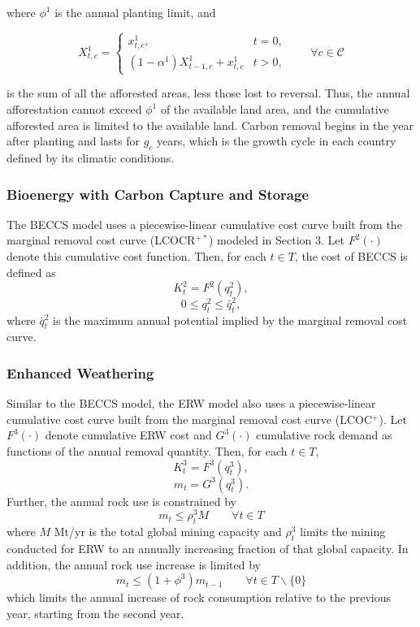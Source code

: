 where $\phi^1$ is the annual planting limit, and 

\begin{equation}
X_{t,c}^1 =
    \begin{cases}
      x_{t,c}^1, & t = 0,\\
      (1-\alpha^1)X_{t-1,c}^1+x_{t,c}^1 & t > 0,
    \end{cases}
    \qquad \forall c \in \mathcal{C}
\end{equation}

is the sum of all the afforested areas, less those lost to reversal. Thus, the annual afforestation cannot exceed $\phi^1$ of the available land area, and the cumulative afforested area is limited to the available land. Carbon removal begins in the year after planting and lasts for $g_c$ years, which is the growth cycle in each country defined by its climatic conditions.

\subsubsection{Bioenergy with Carbon Capture and Storage}
The BECCS model uses a piecewise-linear cumulative cost curve built from the marginal removal cost curve (LCOCR$^{+*}$) modeled in Section 3. Let $F^2(\cdot)$ denote this cumulative cost function. Then, for each $t \in T$, the cost of BECCS is defined as
\begin{equation} 
K^2_t = F^2(q_t^2),
\end{equation}
\begin{equation} 
0 \leq q_t^2 \leq \bar{q}_t^2,
\end{equation}
where $\bar{q}_t^2$ is the maximum annual potential implied by the marginal removal cost curve.

\subsubsection{Enhanced Weathering}
Similar to the BECCS model, the ERW model also uses a piecewise-linear cumulative cost curve built from the marginal removal cost curve (LCOC$^+$). Let $F^3(\cdot)$ denote  cumulative ERW cost and $G^3(\cdot)$ cumulative rock demand as functions of the annual removal quantity. Then, for each $t \in T$,
\begin{equation} 
K^3_t = F^3(q_t^3),
\end{equation}
\begin{equation} 
m_t = G^3(q_t^3).
\end{equation}
Further, the annual rock use is constrained by
\begin{equation} 
m_t \leq \rho_t^3M \qquad \forall t \in T
\end{equation}
where $M$ Mt/yr is the total global mining capacity and $\rho_t^3$ limits the mining conducted for ERW to an annually increasing fraction of that global capacity. In addition, the annual rock use increase is limited by
\begin{equation} 
m_t \leq (1+\phi^3)m_{t-1}   \qquad \forall t \in T\backslash\{ 0 \}
\end{equation}
which limits the annual increase of rock consumption relative to the previous year, starting from the second year.


